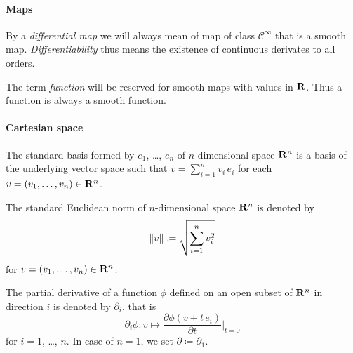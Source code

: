 \paragraph{Maps}

By a \emph{differential map} we will always mean of map of class $\mathcal C^\infty$
that is a smooth map. \emph{Differentiability} thus means the existence of
continuous derivates to all orders.

The term \emph{function} will be reserved for smooth maps with values in $\mathbf{R}$.
Thus a function is always a smooth function.

\paragraph{Cartesian space}
The standard basis formed by $e_1$, \dots, $e_n$ of $n$-dimensional space $\mathbf{R}^n$ is
a basis of the underlying vector space such that $v = \sum_{i = 1}^n v_i \, e_i
$ for each $v = (v_1, \dotsc, v_n) \in \mathbf{R}^n$. 

The standard Euclidean norm of $n$-dimensional space $\mathbf{R}^n$ is denoted
by
\[
    \lVert v\rVert \coloneqq \sqrt{\sum_{i = 1}^n v_i^2}
\]
for $v = (v_1, \dotsc, v_n) \in \mathbf{R}^n$.

The partial derivative of a function $\phi$ defined on an open subset of $\mathbf{R}^n$
in direction $i$ is denoted by $\partial_i$, that is
\[
  \partial_i \phi\colon v \mapsto \frac{\partial \phi(v + t \, e_i)}{\partial t}|_{t = 0}
\]
for $i = 1$, \dots, $n$. In case of $n = 1$, we set $\partial \coloneqq \partial_1$.
